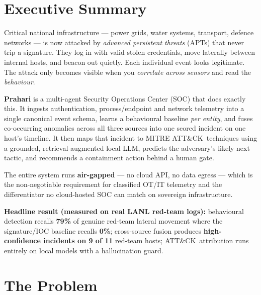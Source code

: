 \documentclass[11pt,a4paper]{article}
\begin{document}
\tableofcontents
\thispagestyle{fancy}
\newpage

\section{Executive Summary}

Critical national infrastructure — power grids, water systems, transport, defence networks —
is now attacked by \emph{advanced persistent threats} (APTs) that never trip a signature.
They log in with valid stolen credentials, move laterally between internal hosts, and beacon
out quietly. Each individual event looks legitimate. The attack only becomes visible when you
\emph{correlate across sensors} and read the \emph{behaviour}.

\textbf{Prahari} is a multi-agent Security Operations Center (SOC) that does exactly this. It
ingests authentication, process/endpoint and network telemetry into a single canonical event
schema, learns a behavioural baseline \emph{per entity}, and fuses co-occurring anomalies
across all three sources into one scored incident on one host's timeline. It then maps that
incident to MITRE ATT\&CK\ techniques using a grounded, retrieval-augmented local LLM, predicts
the adversary's likely next tactic, and recommends a containment action behind a human gate.

The entire system runs \textbf{air-gapped} — no cloud API, no data egress — which is the
non-negotiable requirement for classified OT/IT telemetry and the differentiator no
cloud-hosted SOC can match on sovereign infrastructure.

\begin{keybox}
\textbf{Headline result (measured on real LANL red-team logs):} behavioural detection recalls
\textbf{79\%} of genuine red-team lateral movement where the signature/IOC baseline recalls
\textbf{0\%}; cross-source fusion produces \textbf{high-confidence incidents on 9 of 11}
red-team hosts; ATT\&CK\ attribution runs entirely on local models with a hallucination guard.
\end{keybox}

\section{The Problem}
\end{document}
